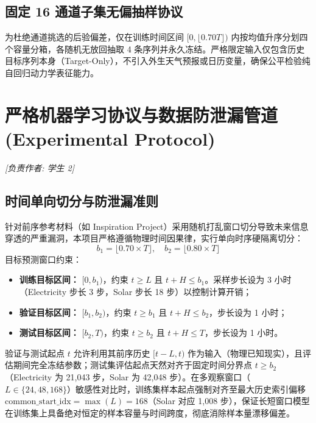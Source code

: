 \documentclass[11pt,a4paper,UTF8]{ctexart}
\begin{document}
\subsection{固定 16 通道子集无偏抽样协议}
为杜绝通道挑选的后验偏差，仅在训练时间区间 $[0, \lfloor 0.70 T \rfloor)$ 内按均值升序分划四个容量分箱，各随机无放回抽取 4 条序列并永久冻结。严格限定输入仅包含历史目标序列本身（Target-Only），不引入外生天气预报或日历变量，确保公平检验纯自回归动力学表征能力。

\section{严格机器学习协议与数据防泄漏管道 (Experimental Protocol)}
\label{sec:protocol}
\noindent\textit{[负责作者: 学生 2]}

\subsection{时间单向切分与防泄漏准则}
针对前序参考材料（如 Inspiration Project）采用随机打乱窗口切分导致未来信息穿透的严重漏洞，本项目严格遵循物理时间因果律，实行单向时序硬隔离切分：
\begin{equation}
    b_1 = \lfloor 0.70 \times T \rfloor, \quad b_2 = \lfloor 0.80 \times T \rfloor
\end{equation}
目标预测窗口约束：
\begin{itemize}
    \item \textbf{训练目标区间：} $[0, b_1)$，约束 $t \ge L$ 且 $t + H \le b_1$。采样步长设为 3 小时（Electricity 步长 3 步，Solar 步长 18 步）以控制计算开销；
    \item \textbf{验证目标区间：} $[b_1, b_2)$，约束 $t \ge b_1$ 且 $t + H \le b_2$，步长设为 1 小时；
    \item \textbf{测试目标区间：} $[b_2, T)$，约束 $t \ge b_2$ 且 $t + H \le T$，步长设为 1 小时。
\end{itemize}
验证与测试起点 $t$ 允许利用其前序历史 $[t-L, t)$ 作为输入（物理已知现实），且评估期间完全冻结参数；测试集评估起点天然对齐于固定时间分界点 $t \ge b_2$（Electricity 为 21,043 步，Solar 为 42,048 步）。在多观察窗口（$L \in \{24, 48, 168\}$）敏感性对比时，训练集样本起点强制对齐至最大历史索引偏移 $\text{common\_start\_idx} = \max(L) = 168$（Solar 对应 1,008 步），保证长短窗口模型在训练集上具备绝对恒定的样本容量与时间跨度，彻底消除样本量漂移偏差。
\end{document}
